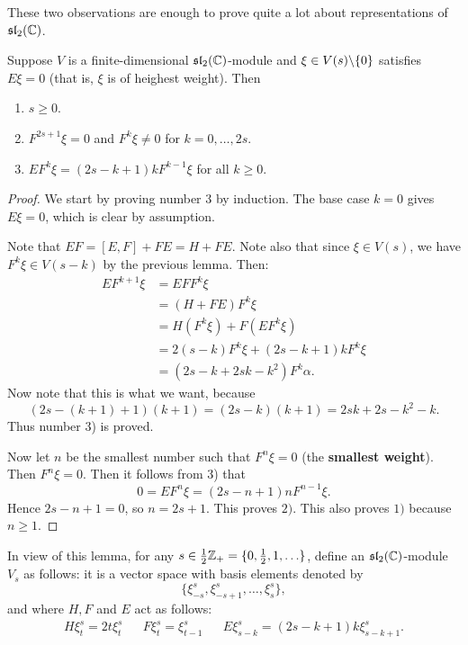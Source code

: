 \documentclass[11pt, english]{article}
\begin{document}
These two observations are enough to prove quite a lot about representations of $\mathfrak{sl}_2(\mathbb{C})$.

\begin{lemma}
Suppose $V$ is a finite-dimensional $\mathfrak{sl}_2(\mathbb{C})$-module and $\xi \in V(s) \backslash \{ 0 \}$ satisfies $E \xi = 0$ (that is, $\xi$ is of heighest weight). Then
\begin{enumerate}
\item $s \geq 0$.
\item $F^{2s+1}\xi = 0$ and $F^k\xi \neq 0$ for $k=0,\ldots,2s$. 
\item $EF^k \xi = (2s-k+1)kF^{k-1} \xi$ for all $k \geq 0$.
\end{enumerate}
\end{lemma}
\begin{proof}

We start by proving number 3 by induction. The base case $k=0$ gives $E \xi = 0$, which is clear by assumption.

Note that $EF = [E,F]+FE = H+FE$. Note also that since $\xi \in V(s)$, we have $F^k \xi \in V(s-k)$ by the previous lemma. Then:
\begin{align*}
  EF^{k+1} \xi &= EF F^k \xi \\
&= (H+FE) F^k \xi \\
&= H(F^k \xi) + F(EF^k \xi) \\
&= 2(s-k)F^k \xi + (2s-k+1)k F^k \xi \\
&= (2s-k+2sk-k^2) F^k \alpha.
\end{align*}
Now note that this is what we want, because
$$
(2s-(k+1)+1)(k+1) = (2s-k)(k+1) = 2sk+2s-k^2-k.
$$
Thus number 3) is proved.

Now let $n$ be the smallest number such that $F^n \xi = 0$ (the \textbf{smallest weight}). Then $F^n \xi = 0$. Then it follows from 3) that
$$
0 = EF^n \xi = (2s-n+1)nF^{n-1} \xi.
$$
Hence $2s-n+1=0$, so $n=2s+1$. This proves $2)$. This also proves $1)$ because $n \geq 1$. 
\end{proof}

In view of this lemma, for any $s \in \frac 12 \mathbb{Z}_+ = \{ 0, \frac 12, 1, \ldots \}$, define an $\mathfrak{sl}_2(\mathbb{C})$-module $V_s$ as follows: it is a vector space with basis elements denoted by
$$
\{ \xi_{-s}^s, \xi_{-s+1}^s, \ldots, \xi_s^s \},
$$
and where $H,F$ and $E$ act as follows:
\begin{align*}
 H \xi_t^s = 2t \xi_t^s && F\xi_t^s = \xi_{t-1}^s && E \xi_{s-k}^s = (2s-k+1)k\xi_{s-k+1}^s.
\end{align*}
\end{document}
